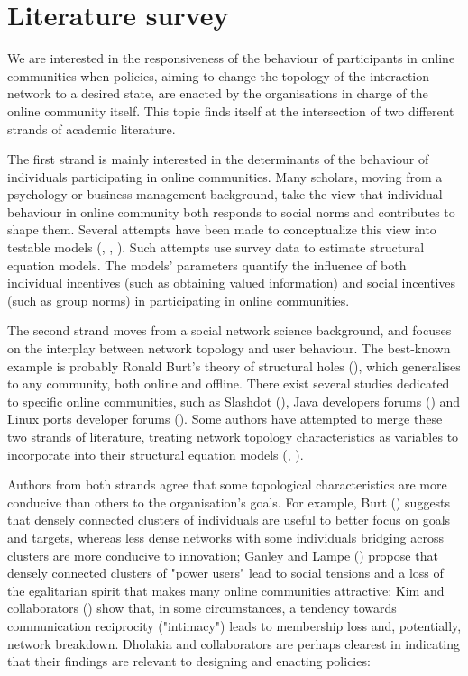 \section{Literature survey}

We are interested in the responsiveness of the behaviour of participants in online communities when policies, aiming to change the topology of the interaction network to a desired state, are enacted by the organisations in charge of the online community itself. This topic finds itself at the intersection of two different strands of academic literature.

The first strand is mainly interested in the determinants of the behaviour of individuals participating in online communities. Many scholars, moving from a psychology or business management background, take the view that individual behaviour in online community both responds to social norms and contributes to shape them. Several attempts have been made to conceptualize this view into testable models (\cite{armstrong2000real}, \cite{dholakia2004social}, \cite{zhou2011social}). Such attempts use survey data to estimate structural equation models. The models' parameters quantify the influence of both individual incentives (such as obtaining valued information) and social incentives (such as group norms) in participating in online communities. 

The second strand moves from a social network science background, and focuses on the interplay between network topology and user behaviour. The best-known example is probably Ronald Burt's theory of structural holes (\cite{burt2005brokerage}), which generalises to any community, both online and offline. There exist several studies dedicated to specific online communities, such as Slashdot (\cite{toral2009empirical}), Java developers forums (\cite{zhang2007expertise}) and Linux ports developer forums (\cite{ganley2009ties}). Some authors have attempted to merge these two strands of literature, treating network topology characteristics as variables to incorporate into their structural equation models (\cite{toral2009empirical}, \cite{ganley2009ties}).

Authors from both strands agree that some topological characteristics are more conducive than others to the organisation's goals. For example, Burt (\cite{burt2005brokerage}) suggests that densely connected clusters of individuals are useful to better focus on goals and targets, whereas less dense networks with some individuals bridging across clusters are more conducive to innovation; Ganley and Lampe (\cite{ganley2009ties}) propose that densely connected clusters of "power users" lead to social tensions and a loss of the egalitarian spirit that makes many online communities attractive; Kim and collaborators (\cite{kim2015group}) show that, in some circumstances, a tendency towards communication reciprocity ("intimacy") leads to membership loss and, potentially, network breakdown. Dholakia and collaborators are perhaps clearest in indicating that their findings are relevant to designing and enacting policies:

